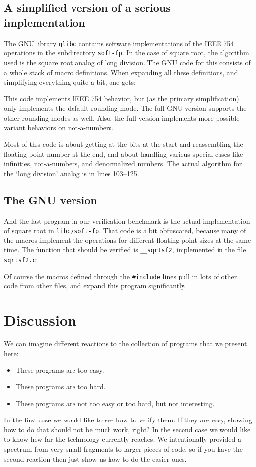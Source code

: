 \documentclass{article}
\begin{document}
\subsection{A simplified version of a serious implementation}
The GNU library \texttt{glibc} contains software implementations of
the IEEE 754 operations in the subdirectory \texttt{soft-fp}.
In the case of square root, the algorithm used is the square root
analog of long division.
The GNU code for this consists of a whole stack of macro definitions.
When expanding all these definitions, and simplifying everything quite a bit, one gets:

This code implements IEEE 754 behavior, but (as the primary simplification)
only implements the default rounding mode.
The full GNU version supports the other rounding modes as well.
Also, the full version implements more possible variant behaviors on not-a-numbers.

Most of this code is about getting at the bits at the start and reassembling the
floating point number at the end, and about
handling various special cases like infinities, not-a-numbers, and
denormalized numbers.
The actual algorithm for the `long division' analog
is in lines 103--125.

\subsection{The GNU version}
And the last program in our verification benchmark is the actual implementation
of square root in \texttt{libc/soft-fp}.
That code is a bit obfuscated, because many of the macros implement the operations
for different floating point sizes at the same time.
The function that should be verified is \lstinline|__sqrtsf2|,
implemented in the file \lstinline|sqrtsf2.c|:

Of course the macros defined through the \lstinline|#include| lines pull in lots of other code from other files, and expand this program significantly.

\section{Discussion}
We can imagine different reactions to the collection of programs that we present here:
\begin{itemize}
\item
These programs are too easy.

\item
These programs are too hard.

\item
These programs are not too easy or too hard, but not interesting.

\end{itemize}
\noindent
In the first case we would like to see how to verify them.
If they are easy, showing how to do that should not be much work, right?
In the second case we would like to know how far the technology
currently reaches.
We intentionally provided a spectrum from very small fragments
to larger pieces of code, so if you have the second reaction then just show us how to do the easier ones.
\end{document}
